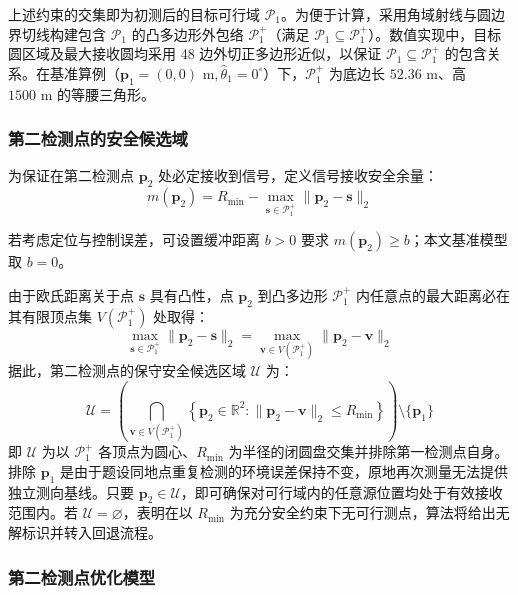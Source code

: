 \documentclass[zihao=-4,a4paper,UTF8]{ctexart}
\begin{document}
上述约束的交集即为初测后的目标可行域 $\mathcal{P}_1$。为便于计算，采用角域射线与圆边界切线构建包含 $\mathcal{P}_1$ 的凸多边形外包络 $\mathcal{P}_1^+$（满足 $\mathcal{P}_1 \subseteq \mathcal{P}_1^+$）。数值实现中，目标圆区域及最大接收圆均采用 48 边外切正多边形近似，以保证 $\mathcal{P}_1 \subseteq \mathcal{P}_1^+$ 的包含关系。在基准算例（$\mathbf{p}_1 = (0, 0)\text{ m}, \hat\theta_1 = 0^\circ$）下，$\mathcal{P}_1^+$ 为底边长 $52.36\text{ m}$、高 $1500\text{ m}$ 的等腰三角形。

\subsubsection{第二检测点的安全候选域}

为保证在第二检测点 $\mathbf{p}_2$ 处必定接收到信号，定义信号接收安全余量：
\begin{equation}
    m(\mathbf{p}_2) = R_{\min} - \max_{\mathbf{s} \in \mathcal{P}_1^+} \|\mathbf{p}_2 - \mathbf{s}\|_2
\end{equation}

若考虑定位与控制误差，可设置缓冲距离 $b > 0$ 要求 $m(\mathbf{p}_2) \ge b$；本文基准模型取 $b = 0$。

由于欧氏距离关于点 $\mathbf{s}$ 具有凸性，点 $\mathbf{p}_2$ 到凸多边形 $\mathcal{P}_1^+$ 内任意点的最大距离必在其有限顶点集 $V(\mathcal{P}_1^+)$ 处取得：
\begin{equation}
    \max_{\mathbf{s} \in \mathcal{P}_1^+} \|\mathbf{p}_2 - \mathbf{s}\|_2 = \max_{\mathbf{v} \in V(\mathcal{P}_1^+)} \|\mathbf{p}_2 - \mathbf{v}\|_2
\end{equation}
据此，第二检测点的保守安全候选区域 $\mathcal{U}$ 为：
\begin{equation}
    \mathcal{U} = \left( \bigcap_{\mathbf{v} \in V(\mathcal{P}_1^+)} \left\{ \mathbf{p}_2 \in \mathbb{R}^2 : \|\mathbf{p}_2 - \mathbf{v}\|_2 \le R_{\min} \right\} \right) \setminus \{\mathbf{p}_1\}
\end{equation}
即 $\mathcal{U}$ 为以 $\mathcal{P}_1^+$ 各顶点为圆心、$R_{\min}$ 为半径的闭圆盘交集并排除第一检测点自身。排除 $\mathbf{p}_1$ 是由于题设同地点重复检测的环境误差保持不变，原地再次测量无法提供独立测向基线。只要 $\mathbf{p}_2 \in \mathcal{U}$，即可确保对可行域内的任意源位置均处于有效接收范围内。若 $\mathcal{U} = \varnothing$，表明在以 $R_{\min}$ 为充分安全约束下无可行测点，算法将给出无解标识并转入回退流程。

\subsubsection{第二检测点优化模型}
\end{document}
